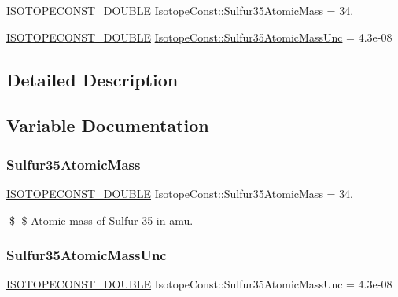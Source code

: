 \begin{DoxyCompactItemize}
\item 
\mbox{\hyperlink{group___isotope_const-_macros_ga8f45a7272ce02c0b4c65c44636ed719a}{I\+S\+O\+T\+O\+P\+E\+C\+O\+N\+S\+T\+\_\+\+D\+O\+U\+B\+LE}} \mbox{\hyperlink{group___isotope_const-_sulfur-_s35_gac9a6f080b1382e7f6f43cf1e0c348d9a}{Isotope\+Const\+::\+Sulfur35\+Atomic\+Mass}} = 34.
\item 
\mbox{\hyperlink{group___isotope_const-_macros_ga8f45a7272ce02c0b4c65c44636ed719a}{I\+S\+O\+T\+O\+P\+E\+C\+O\+N\+S\+T\+\_\+\+D\+O\+U\+B\+LE}} \mbox{\hyperlink{group___isotope_const-_sulfur-_s35_gaa9e7391eee18a49694853191839fb5d2}{Isotope\+Const\+::\+Sulfur35\+Atomic\+Mass\+Unc}} = 4.\+3e-\/08
\end{DoxyCompactItemize}


\subsection{Detailed Description}


\subsection{Variable Documentation}
\mbox{\label{group___isotope_const-_sulfur-_s35_gac9a6f080b1382e7f6f43cf1e0c348d9a}} 
\subsubsection{\texorpdfstring{Sulfur35\+Atomic\+Mass}{Sulfur35AtomicMass}}
{\footnotesize\ttfamily \mbox{\hyperlink{group___isotope_const-_macros_ga8f45a7272ce02c0b4c65c44636ed719a}{I\+S\+O\+T\+O\+P\+E\+C\+O\+N\+S\+T\+\_\+\+D\+O\+U\+B\+LE}} Isotope\+Const\+::\+Sulfur35\+Atomic\+Mass = 34.}

\$ \$ Atomic mass of Sulfur-\/35 in amu. \mbox{\label{group___isotope_const-_sulfur-_s35_gaa9e7391eee18a49694853191839fb5d2}} 
\subsubsection{\texorpdfstring{Sulfur35\+Atomic\+Mass\+Unc}{Sulfur35AtomicMassUnc}}
{\footnotesize\ttfamily \mbox{\hyperlink{group___isotope_const-_macros_ga8f45a7272ce02c0b4c65c44636ed719a}{I\+S\+O\+T\+O\+P\+E\+C\+O\+N\+S\+T\+\_\+\+D\+O\+U\+B\+LE}} Isotope\+Const\+::\+Sulfur35\+Atomic\+Mass\+Unc = 4.\+3e-\/08}

